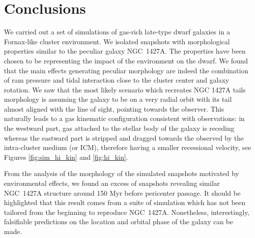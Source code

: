 
\section{Conclusions}
We carried out a set of simulations of gas-rich late-type dwarf galaxies in a Fornax-like cluster environment.
We isolated snapshots with morphological properties similar to the peculiar galaxy NGC~1427A. The properties have been chosen to be representing the impact of the environment on the dwarf.
We found that the main effects generating peculiar morphology are indeed the combination of ram pressure and tidal interaction close to the cluster center and galaxy rotation.
We saw that the most likely scenario which recreates NGC 1427A tails morphology is assuming the galaxy to be on a very radial orbit with its tail almost aligned with the line of sight, pointing towards the observer.
This naturally leads to a gas kinematic configuration consistent with \Hi{} observations: in the westward part, gas attached to the stellar body of the galaxy is receding whereas the eastward part is stripped and dragged towards the observed by the intra-cluster medium (or ICM), therefore having a smaller recessional velocity, see Figures \ref{fig:sim_hi_kin} and \ref{fig:hi_kin}.

From the analysis of the morphology of the simulated snapshots motivated by environmental effects, we found an excess of snapshots revealing similar NGC~1427A structure around 150 Myr before pericenter passage.
It should be highlighted that this result comes from a suite of simulation which has not been tailored from the beginning to reproduce NGC~1427A.
Nonetheless, interestingly, falsifiable predictions on the location and orbital phase of the galaxy can be made.

